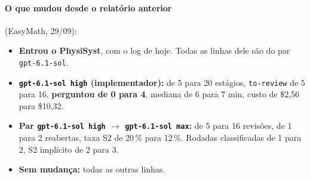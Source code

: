 \documentclass[11pt,a4paper]{article}
\begin{document}
\medskip
{}

\paragraph{O que mudou desde o relatório anterior} (EasyMath, 29/09):
\begin{itemize}
  \item \textbf{Entrou o PhysiSyst}, com o log de hoje. Todas as linhas
        dele são do par \texttt{gpt-6.1-sol}.
  \item \textbf{\texttt{gpt-6.1-sol high} (implementador):} de 5 para 20
        estágios, \texttt{to-review} de 5 para 16, \textbf{perguntou de 0
        para 4}, mediana de 6 para 7 min, custo de \$2,56 para \$10,32.
  \item \textbf{Par \texttt{gpt-6.1-sol high} $\to$ \texttt{gpt-6.1-sol
        max}:} de 5 para 16 revisões, de 1 para 2 reabertas, taxa S2 de
        20\,\% para 12\,\%. Rodadas classificadas de 1 para 2, S2 implícito de
        2 para 3.
  \item \textbf{Sem mudança:} todas as outras linhas.
\end{itemize}
\end{document}
